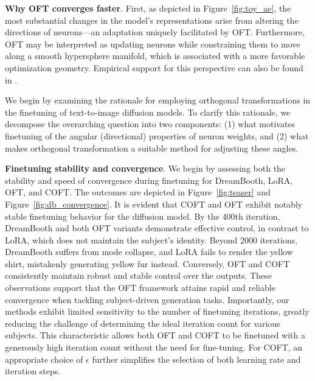 \begin{itemize}[leftmargin=*,nosep]
\textbf{Why OFT converges faster}. First, as depicted in Figure~\ref{fig:toy_ae}, the most substantial changes in the model’s representations arise from altering the directions of neurons—an adaptation uniquely facilitated by OFT. Furthermore, OFT may be interpreted as updating neurons while constraining them to move along a smooth hypersphere manifold, which is associated with a more favorable optimization geometry. Empirical support for this perspective can also be found in \cite{liu2021orthogonal}.

We begin by examining the rationale for employing orthogonal transformations in the finetuning of text-to-image diffusion models. To clarify this rationale, we decompose the overarching question into two components: (1) what motivates finetuning of the angular (directional) properties of neuron weights, and (2) what makes orthogonal transformation a suitable method for adjusting these angles.

\textbf{Finetuning stability and convergence}. We begin by assessing both the stability and speed of convergence during finetuning for DreamBooth, LoRA, OFT, and COFT. The outcomes are depicted in Figure~\ref{fig:teaser} and Figure~\ref{fig:db_convergence}. It is evident that COFT and OFT exhibit notably stable finetuning behavior for the diffusion model. By the 400th iteration, DreamBooth and both OFT variants demonstrate effective control, in contrast to LoRA, which does not maintain the subject’s identity. Beyond 2000 iterations, DreamBooth suffers from mode collapse, and LoRA fails to render the yellow shirt, mistakenly generating yellow fur instead. Conversely, OFT and COFT consistently maintain robust and stable control over the outputs. These observations support that the OFT framework attains rapid and reliable convergence when tackling subject-driven generation tasks. Importantly, our methods exhibit limited sensitivity to the number of finetuning iterations, greatly reducing the challenge of determining the ideal iteration count for various subjects. This characteristic allows both OFT and COFT to be finetuned with a generously high iteration count without the need for fine-tuning. For COFT, an appropriate choice of $\epsilon$ further simplifies the selection of both learning rate and iteration steps.


\end{itemize}
